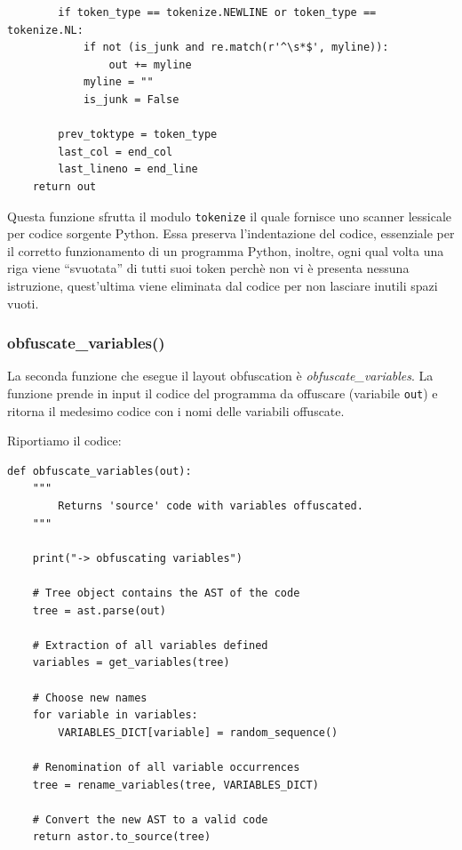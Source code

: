 \documentclass[a4paper,oneside,openright,titlepage,10pt,footinclude,headinclude]{scrbook}
\begin{document}
\begin{graybox}[innerleftmargin=2,]
\begin{lstlisting}
        if token_type == tokenize.NEWLINE or token_type == tokenize.NL:
            if not (is_junk and re.match(r'^\s*$', myline)):
                out += myline
            myline = ""
            is_junk = False

        prev_toktype = token_type
        last_col = end_col
        last_lineno = end_line
    return out
\end{lstlisting}
\end{graybox}
Questa funzione sfrutta il modulo \texttt{tokenize} il quale  fornisce uno scanner lessicale per codice sorgente Python.
Essa preserva l'indentazione del codice, essenziale per il corretto funzionamento di un programma Python, inoltre, ogni qual volta una  riga viene ``svuotata'' di tutti suoi token perchè non vi è presenta nessuna istruzione, quest'ultima viene eliminata dal codice per non lasciare inutili spazi vuoti.

\subsubsection{obfuscate\_variables()}\label{obfuscate_variables}

La seconda funzione che esegue il layout obfuscation è \emph{obfuscate\_variables}.
La funzione prende in input il codice del programma da offuscare (variabile \texttt{out}) e ritorna il medesimo codice con i nomi delle variabili offuscate.\medskip


\noindent Riportiamo il codice:
\begin{graybox}[innerleftmargin=2,]
\begin{lstlisting}
def obfuscate_variables(out):
    """
        Returns 'source' code with variables offuscated.
    """

    print("-> obfuscating variables")

    # Tree object contains the AST of the code
    tree = ast.parse(out)

    # Extraction of all variables defined
    variables = get_variables(tree)

    # Choose new names
    for variable in variables:
        VARIABLES_DICT[variable] = random_sequence()

    # Renomination of all variable occurrences
    tree = rename_variables(tree, VARIABLES_DICT)

    # Convert the new AST to a valid code
    return astor.to_source(tree)
\end{lstlisting}
\end{graybox}
\end{document}
